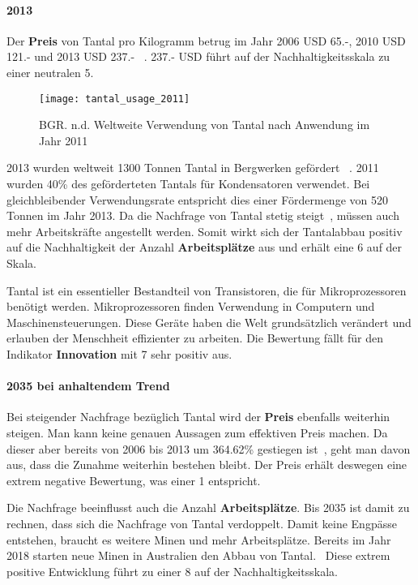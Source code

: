 \paragraph{2013}
Der \textbf{Preis} von Tantal pro Kilogramm betrug im Jahr 2006 USD 65.-, 2010 USD 121.- und 2013 USD 237.- ~\cite{tantal_price2}. 237.- USD führt auf der Nachhaltigkeitsskala zu einer neutralen 5.

\begin{figure}[h]
\centering
\texttt{[image: tantal\_usage\_2011]}
\caption{BGR. n.d. Weltweite Verwendung von Tantal nach Anwendung im Jahr 2011 ~\cite{tantal_usage}}
\label{}
\end{figure}

2013 wurden weltweit 1300 Tonnen Tantal in Bergwerken gefördert ~\cite{tantal_price2}. 2011 wurden 40\% des geförderteten Tantals für Kondensatoren verwendet. Bei gleichbleibender Verwendungsrate entspricht dies einer Fördermenge von 520 Tonnen im Jahr 2013.
Da die Nachfrage von Tantal stetig steigt~\cite{tantal_price2}, müssen auch mehr Arbeitskräfte angestellt werden. Somit wirkt sich der Tantalabbau positiv auf die Nachhaltigkeit der Anzahl \textbf{Arbeitsplätze} aus und erhält eine 6 auf der Skala.

Tantal ist ein essentieller Bestandteil von Transistoren, die für Mikroprozessoren benötigt werden. Mikroprozessoren finden Verwendung in Computern und Maschinensteuerungen. Diese Geräte haben die Welt grundsätzlich verändert und erlauben der Menschheit effizienter zu arbeiten. Die Bewertung fällt für den Indikator \textbf{Innovation} mit 7 sehr positiv aus.

\paragraph{2035 bei anhaltendem Trend}
Bei steigender Nachfrage bezüglich Tantal wird der \textbf{Preis} ebenfalls weiterhin steigen. Man kann keine genauen Aussagen zum effektiven Preis machen. Da dieser aber bereits von 2006 bis 2013 um 364.62\% gestiegen ist~\cite{tantal_price2}, geht man davon aus, dass die Zunahme weiterhin bestehen bleibt. Der Preis erhält deswegen eine extrem negative Bewertung, was einer 1 entspricht.

Die Nachfrage beeinflusst auch die Anzahl \textbf{Arbeitsplätze}. Bis 2035 ist damit zu rechnen, dass sich die Nachfrage von Tantal verdoppelt. Damit keine Engpässe entstehen, braucht es weitere Minen und mehr Arbeitsplätze. Bereits im Jahr 2018 starten neue Minen in Australien den Abbau von Tantal.~\cite{new_mine_aus} Diese extrem positive Entwicklung führt zu einer 8 auf der Nachhaltigkeitsskala.

